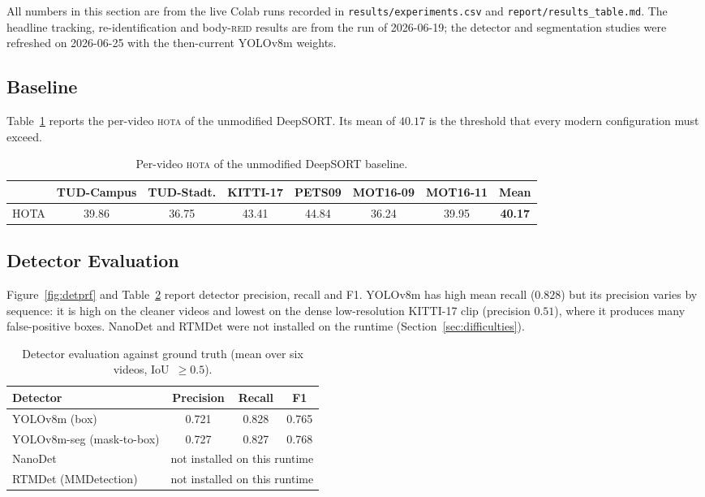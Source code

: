 \documentclass[12pt, a4paper]{article}
\newcommand{\hota}{\textsc{hota}}
\newcommand{\reid}{\textsc{reid}}
\begin{document}
All numbers in this section are from the live Colab runs recorded in
\texttt{results/experiments.csv} and \texttt{report/results\_table.md}. The headline tracking,
re-identification and body-\reid{} results are from the run of 2026-06-19; the detector and
segmentation studies were refreshed on 2026-06-25 with the then-current YOLOv8m weights.

\subsection{Baseline}
Table~\ref{tab:baseline} reports the per-video \hota{} of the unmodified DeepSORT. Its mean of
$40.17$ is the threshold that every modern configuration must exceed.

\begin{table}[H]
\centering
\caption{Per-video \hota{} of the unmodified DeepSORT baseline.}
\label{tab:baseline}
\small
\setlength{\tabcolsep}{4.5pt}
\begin{tabular}{lccccccc}
\toprule
 & TUD-Campus & TUD-Stadt. & KITTI-17 & PETS09 & MOT16-09 & MOT16-11 & \textbf{Mean} \\
\midrule
HOTA & 39.86 & 36.75 & 43.41 & 44.84 & 36.24 & 39.95 & \textbf{40.17} \\
\bottomrule
\end{tabular}
\end{table}

\subsection{Detector Evaluation}
Figure~\ref{fig:detprf} and Table~\ref{tab:detector} report detector precision, recall and F1.
YOLOv8m has high mean recall ($0.828$) but its precision varies by sequence: it is high on the
cleaner videos and lowest on the dense low-resolution KITTI-17 clip (precision $0.51$), where it
produces many false-positive boxes. NanoDet and RTMDet were not installed on the
runtime (Section~\ref{sec:difficulties}).

\begin{table}[H]
\centering
\caption{Detector evaluation against ground truth (mean over six videos, IoU~$\geq 0.5$).}
\label{tab:detector}
\begin{tabular}{lccc}
\toprule
\textbf{Detector} & \textbf{Precision} & \textbf{Recall} & \textbf{F1} \\
\midrule
YOLOv8m (box)            & 0.721 & 0.828 & 0.765 \\
YOLOv8m-seg (mask-to-box) & 0.727 & 0.827 & 0.768 \\
NanoDet                  & \multicolumn{3}{c}{not installed on this runtime} \\
RTMDet (MMDetection)     & \multicolumn{3}{c}{not installed on this runtime} \\
\bottomrule
\end{tabular}
\end{table}
\end{document}
